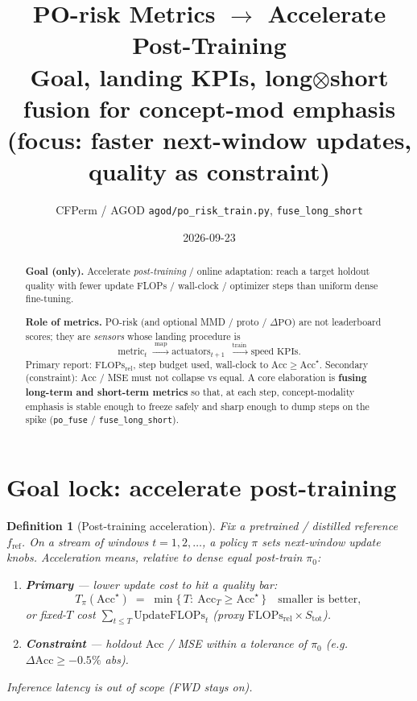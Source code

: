 \documentclass[11pt]{article}
\title{\textbf{PO-risk Metrics $\to$ Accelerate Post-Training}\\[0.35em]
\large Goal, landing KPIs, long$\otimes$short fusion for concept-mod emphasis\\[0.15em]
\large (focus: faster next-window updates, quality as constraint)}
\author{CFPerm / AGOD \quad \texttt{agod/po\_risk\_train.py}, \texttt{fuse\_long\_short}}
\date{2026-09-23}
\newtheorem{definition}{Definition}
\newcommand{\PO}{\mathrm{PO}}
\newcommand{\Acc}{\mathrm{Acc}}
\newcommand{\Flops}{\mathrm{FLOPs}_{\mathrm{rel}}}
\begin{document}
\maketitle

\begin{abstract}
\textbf{Goal (only).}
Accelerate \emph{post-training} / online adaptation:
reach a target holdout quality with fewer update FLOPs / wall-clock /
optimizer steps than uniform dense fine-tuning.

\textbf{Role of metrics.}
PO-risk (and optional MMD / proto / $\Delta\PO$) are not leaderboard
scores; they are \emph{sensors} whose landing procedure is
\[
  \text{metric}_t
  \;\xrightarrow{\;\text{map}\;}
  \text{actuators}_{t+1}
  \;\xrightarrow{\;\text{train}\;}
  \text{speed KPIs}.
\]
Primary report: $\Flops$, step budget used, wall-clock to
$\Acc\ge\Acc^\star$.
Secondary (constraint): $\Acc$ / MSE must not collapse vs equal.
A core elaboration is \textbf{fusing long-term and short-term metrics}
so that, at each step, concept-modality emphasis is stable enough to
freeze safely and sharp enough to dump steps on the spike
(\texttt{po\_fuse} / \texttt{fuse\_long\_short}).
\end{abstract}

\tableofcontents
\vspace{1em}

\section{Goal lock: accelerate post-training}
\label{sec:goal}

\begin{definition}[Post-training acceleration]
Fix a pretrained / distilled reference $f_{\mathrm{ref}}$.
On a stream of windows $t=1,2,\ldots$, a policy $\pi$ sets
next-window update knobs.
Acceleration means, relative to dense equal post-train $\pi_0$:
\begin{enumerate}[leftmargin=1.4em,itemsep=2pt]
  \item \textbf{Primary} --- lower update cost to hit a quality bar:
        \[
          T_{\pi}(\Acc^\star)
          \;=\;
          \min\bigl\{\,T:\ \Acc_T\ge\Acc^\star\,\bigr\}
          \quad\text{smaller is better},
        \]
        or fixed-$T$ cost $\sum_{t\le T}\mathrm{UpdateFLOPs}_t$
        (proxy $\Flops\times S_{\mathrm{tot}}$).
  \item \textbf{Constraint} --- holdout $\Acc$ / MSE within a
        tolerance of $\pi_0$ (e.g.\ $\Delta\Acc\ge -0.5\%$ abs).
\end{enumerate}
Inference latency is \emph{out of scope} (FWD stays on).
\end{definition}
\end{document}
